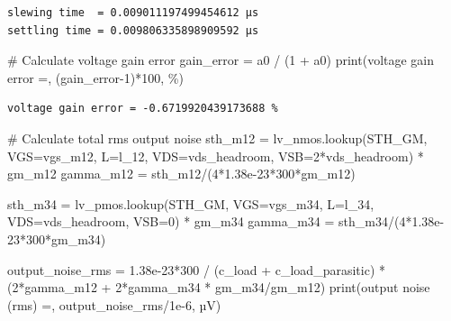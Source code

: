 \documentclass[
  a4paper,
  DIV=11,
  numbers=noendperiod]{scrartcl}
\newenvironment{Shaded}{\begin{snugshade}}{\end{snugshade}}
\newcommand{\BuiltInTok}[1]{\textcolor[rgb]{0.00,0.23,0.31}{#1}}
\newcommand{\CommentTok}[1]{\textcolor[rgb]{0.37,0.37,0.37}{#1}}
\newcommand{\DecValTok}[1]{\textcolor[rgb]{0.68,0.00,0.00}{#1}}
\newcommand{\FloatTok}[1]{\textcolor[rgb]{0.68,0.00,0.00}{#1}}
\newcommand{\NormalTok}[1]{\textcolor[rgb]{0.00,0.23,0.31}{#1}}
\newcommand{\OperatorTok}[1]{\textcolor[rgb]{0.37,0.37,0.37}{#1}}
\newcommand{\StringTok}[1]{\textcolor[rgb]{0.13,0.47,0.30}{#1}}
\begin{document}
\begin{tcolorbox}
\begin{verbatim}
slewing time  = 0.009011197499454612 µs
settling time = 0.009806335898909592 µs
\end{verbatim}

\begin{Shaded}
\begin{Highlighting}[]
\CommentTok{\# Calculate voltage gain error}
\NormalTok{gain\_error }\OperatorTok{=}\NormalTok{ a0 }\OperatorTok{/}\NormalTok{ (}\DecValTok{1} \OperatorTok{+}\NormalTok{ a0)}
\BuiltInTok{print}\NormalTok{(}\StringTok{\textquotesingle{}voltage gain error =\textquotesingle{}}\NormalTok{, (gain\_error}\OperatorTok{{-}}\DecValTok{1}\NormalTok{)}\OperatorTok{*}\DecValTok{100}\NormalTok{, }\StringTok{\textquotesingle{}\%\textquotesingle{}}\NormalTok{)}
\end{Highlighting}
\end{Shaded}

\begin{verbatim}
voltage gain error = -0.6719920439173688 %
\end{verbatim}

\begin{Shaded}
\begin{Highlighting}[]
\CommentTok{\# Calculate total rms output noise}
\NormalTok{sth\_m12 }\OperatorTok{=}\NormalTok{ lv\_nmos.lookup(}\StringTok{\textquotesingle{}STH\_GM\textquotesingle{}}\NormalTok{, VGS}\OperatorTok{=}\NormalTok{vgs\_m12, L}\OperatorTok{=}\NormalTok{l\_12, VDS}\OperatorTok{=}\NormalTok{vds\_headroom, VSB}\OperatorTok{=}\DecValTok{2}\OperatorTok{*}\NormalTok{vds\_headroom) }\OperatorTok{*}\NormalTok{ gm\_m12}
\NormalTok{gamma\_m12 }\OperatorTok{=}\NormalTok{ sth\_m12}\OperatorTok{/}\NormalTok{(}\DecValTok{4}\OperatorTok{*}\FloatTok{1.38e{-}23}\OperatorTok{*}\DecValTok{300}\OperatorTok{*}\NormalTok{gm\_m12)}

\NormalTok{sth\_m34 }\OperatorTok{=}\NormalTok{ lv\_pmos.lookup(}\StringTok{\textquotesingle{}STH\_GM\textquotesingle{}}\NormalTok{, VGS}\OperatorTok{=}\NormalTok{vgs\_m34, L}\OperatorTok{=}\NormalTok{l\_34, VDS}\OperatorTok{=}\NormalTok{vds\_headroom, VSB}\OperatorTok{=}\DecValTok{0}\NormalTok{) }\OperatorTok{*}\NormalTok{ gm\_m34}
\NormalTok{gamma\_m34 }\OperatorTok{=}\NormalTok{ sth\_m34}\OperatorTok{/}\NormalTok{(}\DecValTok{4}\OperatorTok{*}\FloatTok{1.38e{-}23}\OperatorTok{*}\DecValTok{300}\OperatorTok{*}\NormalTok{gm\_m34)}

\NormalTok{output\_noise\_rms }\OperatorTok{=} \FloatTok{1.38e{-}23}\OperatorTok{*}\DecValTok{300} \OperatorTok{/}\NormalTok{ (c\_load }\OperatorTok{+}\NormalTok{ c\_load\_parasitic) }\OperatorTok{*}\NormalTok{ (}\DecValTok{2}\OperatorTok{*}\NormalTok{gamma\_m12 }\OperatorTok{+} \DecValTok{2}\OperatorTok{*}\NormalTok{gamma\_m34 }\OperatorTok{*}\NormalTok{ gm\_m34}\OperatorTok{/}\NormalTok{gm\_m12)}
\BuiltInTok{print}\NormalTok{(}\StringTok{\textquotesingle{}output noise (rms) =\textquotesingle{}}\NormalTok{, output\_noise\_rms}\OperatorTok{/}\FloatTok{1e{-}6}\NormalTok{, }\StringTok{\textquotesingle{}µV\textquotesingle{}}\NormalTok{)}
\end{Highlighting}
\end{Shaded}


\end{tcolorbox}
\end{document}
